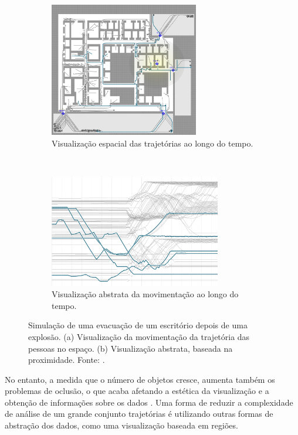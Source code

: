 \begin{description}
\begin{figure}[ht!]
  \centering
  \begin{subfigure}[t]{0.45\textwidth}
    \centering
    \includegraphics[width=65mm]{../figuras/proximidade-espacial.png}
    \caption{Visualização espacial das trajetórias ao longo do tempo. \label{fig:viz-espacial}}
  \end{subfigure}
  ~
  \begin{subfigure}[t]{0.45\textwidth}
    \centering
    \includegraphics[width=75mm]{../figuras/proximidade-abstrata.png}
    \caption{Visualização abstrata da movimentação ao longo do tempo. \label{fig:viz-abstrata}}
  \end{subfigure}

  \caption[Visualização espacial vs abstrata da movimentação de pessoas]{Simulação de uma evacuação de um escritório depois de uma explosão.
(a) Visualização da movimentação da trajetória das pessoas no espaço. (b)
Visualização abstrata, baseada na proximidade.  Fonte: \citet{Tarik2009}.
\label{fig:tarik}}
\end{figure}


  No entanto, a medida que o número de objetos cresce, aumenta também os
problemas de oclusão, o que acaba afetando a estética da visualização e a
obtenção de informações sobre os dados \citep{Zhou2013}. Uma forma de reduzir
a complexidade de análise de um grande conjunto  trajetórias é utilizando
outras formas de abstração dos dados, como uma visualização baseada em regiões.


\end{description}
